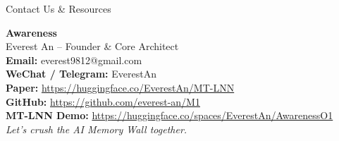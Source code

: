 ﻿\documentclass[aspectratio=169, 10pt]{beamer}
\begin{document}
\begin{frame}{Contact Us \& Resources}
\begin{center}
    \LARGE \textbf{Awareness} \\
    \vspace{0.5em}
    \large Everest An -- Founder \& Core Architect \\
    \vspace{1.5em}
    \normalsize
    \textbf{Email:} everest9812@gmail.com \\
    \textbf{WeChat / Telegram:} EverestAn \\
    \vspace{1.5em}
    \small
    \textbf{Paper:} \url{https://huggingface.co/EverestAn/MT-LNN} \\
    \textbf{GitHub:} \url{https://github.com/everest-an/M1} \\
    \textbf{MT-LNN Demo:} \url{https://huggingface.co/spaces/EverestAn/AwarenessO1} \\
    \vspace{1.5em}
    \textit{Let's crush the AI Memory Wall together.}
\end{center}
\end{frame}
\end{document}
